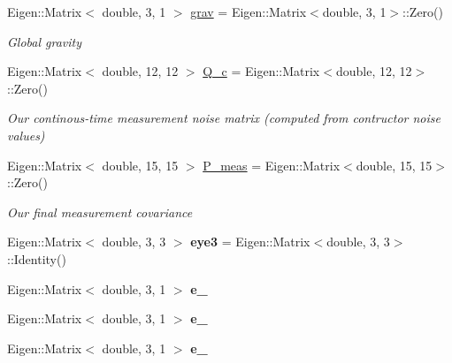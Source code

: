 \begin{DoxyCompactItemize}
Eigen\+::\+Matrix$<$ double, 3, 1 $>$ \hyperlink{classov__core_1_1CpiBase_a43580d4c493d8b44a1c8cab9ad9b8a42}{grav} = Eigen\+::\+Matrix$<$double, 3, 1$>$\+::Zero()
\begin{DoxyCompactList}\small\item\em Global gravity \end{DoxyCompactList}\item 
\mbox{\label{classov__core_1_1CpiBase_a8e34ef29a4679c8a47c7dacd1bb40c23}} 
Eigen\+::\+Matrix$<$ double, 12, 12 $>$ \hyperlink{classov__core_1_1CpiBase_a8e34ef29a4679c8a47c7dacd1bb40c23}{Q\+\_\+c} = Eigen\+::\+Matrix$<$double, 12, 12$>$\+::Zero()
\begin{DoxyCompactList}\small\item\em Our continous-\/time measurement noise matrix (computed from contructor noise values) \end{DoxyCompactList}\item 
\mbox{\label{classov__core_1_1CpiBase_a67e00ae8c7b77288577a1251de52123a}} 
Eigen\+::\+Matrix$<$ double, 15, 15 $>$ \hyperlink{classov__core_1_1CpiBase_a67e00ae8c7b77288577a1251de52123a}{P\+\_\+meas} = Eigen\+::\+Matrix$<$double, 15, 15$>$\+::Zero()
\begin{DoxyCompactList}\small\item\em Our final measurement covariance \end{DoxyCompactList}\item 
\mbox{\label{classov__core_1_1CpiBase_ad266689bc9d3bd8b4f2b245ad58b5246}} 
Eigen\+::\+Matrix$<$ double, 3, 3 $>$ {\bfseries eye3} = Eigen\+::\+Matrix$<$double, 3, 3$>$\+::Identity()
\item 
\mbox{\label{classov__core_1_1CpiBase_a486971a8b5022fdd22dcd93d73a44c8c}} 
Eigen\+::\+Matrix$<$ double, 3, 1 $>$ {\bfseries e\+\_}
\item 
\mbox{\label{classov__core_1_1CpiBase_adce734353b7a1f32da8c96014304cfb7}} 
Eigen\+::\+Matrix$<$ double, 3, 1 $>$ {\bfseries e\+\_}
\item 
\mbox{\label{classov__core_1_1CpiBase_a99d311f75307cdbc40e535beecb0842b}} 
Eigen\+::\+Matrix$<$ double, 3, 1 $>$ {\bfseries e\+\_}

\end{DoxyCompactItemize}
